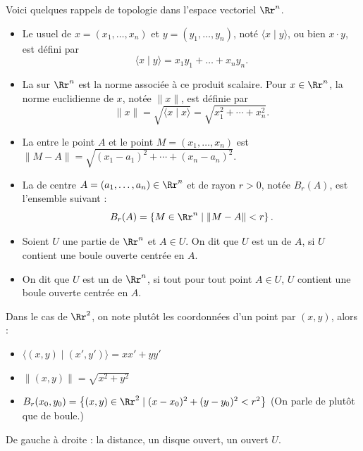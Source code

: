 \documentclass[12pt, class=report,crop=false]{standalone}
\begin{document}
Voici quelques rappels de topologie dans l'espace vectoriel $\Rr^n$. 

\begin{itemize}
  \item Le  usuel de $x=(x_1,\ldots ,x_n)$ et $y=(y_1,\ldots ,y_n)$, noté $\langle x \mid y\rangle$, ou bien $x \cdot y$, est défini par
$$\langle x \mid y\rangle = x_1y_1+\dots +x_ny_n.$$

  \item La  sur $\Rr^n$ est la norme associée à ce produit scalaire. Pour $x\in \Rr^n$, la norme euclidienne de $x$, notée $\| x\|$, est définie par
$$\| x \| = \sqrt{\langle x \mid x\rangle} = \sqrt{x_1^2+\cdots +x_n^2}.$$

  \item La  entre le point $A$ et le point $M=(x_1,\dots ,x_n)$ est $\|M-A\|=\sqrt{(x_1-a_1)^2+\cdots +(x_n-a_n)^2}$.
  
  \item La  de centre $A = (a_1,\ldots ,a_n) \in \Rr^n$ et de rayon $r>0$, notée $B_r(A)$, est l'ensemble suivant :
$$B_r(A)=\left\{M\in \Rr^n \mid \|M-A\|<r \right\}.$$


  \item Soient $U$ une partie de $\Rr^n$ et $A\in U$.
On dit que $U$ est un  de $A$, si $U$ contient une boule ouverte centrée en $A$.

  \item On dit que $U$ est un  de $\Rr^n$, si tout pour tout point $A \in U$, $U$ contient une boule ouverte centrée en $A$.
\end{itemize}

Dans le cas de $\Rr^2$, on note plutôt les coordonnées d'un point par $(x,y)$, alors :
\begin{itemize}
  \item $\langle (x,y) \mid (x',y') \rangle = xx'+yy'$
  \item $\| (x,y) \| = \sqrt{x^2+y^2}$
  \item $B_r(x_0,y_0) = \left\{ (x,y) \in \Rr^2 \mid (x-x_0)^2+(y-y_0)^2 <r^2 \right\}$ (On parle de  plutôt que de boule.)
\end{itemize}

De gauche à droite : la distance, un disque ouvert, un ouvert $U$.

\end{document}
